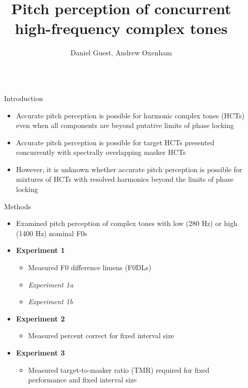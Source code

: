 \documentclass[capfont, final]{beamer}\usepackage[]{graphicx}\usepackage[]{color}
\title{Pitch perception of concurrent high-frequency complex tones}
\author{Daniel Guest, Andrew Oxenham}
\institute{University of Minnesota, Department of Psychology, Auditory Perception and Cognition Lab}
\newcommand{\highlight}[1]{\textbf{\textcolor{UMNMaroon}{#1}}}
\newlength{\sepwid}
\newlength{\onecolwid}
\begin{document}
\begin{frame}[t, fragile]
	\begin{columns}[T] %
		\begin{column}{\sepwid}\end{column} %
		\begin{column}{\onecolwid} %
			\begin{block}{Introduction}
				\begin{itemize}
					\item Accurate pitch perception is possible for harmonic complex tones (HCTs) even when all components are beyond putative limits of phase locking \autocite{Lau2017a, Gockel2018}
					\item Accurate pitch perception is possible for target HCTs presented concurrently with spectrally overlapping masker HCTs \autocite{Carlyon1996, Micheyl2010a, Wang2012, Micheyl2006}
					\item However, it is unknown whether accurate pitch perception is possible for mixtures of HCTs with resolved harmonics beyond the limits of phase locking
				\end{itemize}
			\end{block}
			\begin{block}{Methods}
				\begin{itemize}
					\item Examined pitch perception of complex tones with low (280 Hz) or high (1400 Hz) nominal F0s
					\item \highlight{Experiment 1}
						\begin{itemize}
							\item Measured F0 difference limens (F0DLs)
							\item \textit{Experiment 1a}
							\item \textit{Experiment 1b}
						\end{itemize}
					\item \highlight{Experiment 2}
						\begin{itemize}
							\item Measured percent correct for fixed interval size
						\end{itemize}
					\item \highlight{Experiment 3}
						\begin{itemize}
							\item Measured target-to-masker ratio (TMR) required for fixed performance and fixed interval size
						\end{itemize}

\end{itemize}
\end{block}
\end{column}
\end{columns}
\end{frame}
\end{document}

